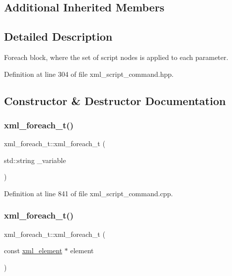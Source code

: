 \subsection*{Additional Inherited Members}


\subsection{Detailed Description}
Foreach block, where the set of script nodes is applied to each parameter. 

Definition at line 304 of file xml\+\_\+script\+\_\+command.\+hpp.



\subsection{Constructor \& Destructor Documentation}
\mbox{\label{structxml__foreach__t_a89fa4359e0a17874e38af17944cb2104}} 
\subsubsection{\texorpdfstring{xml\+\_\+foreach\+\_\+t()}{xml\_foreach\_t()}\hspace{0.1cm}{\footnotesize\ttfamily [1/2]}}
{\footnotesize\ttfamily xml\+\_\+foreach\+\_\+t\+::xml\+\_\+foreach\+\_\+t (\begin{DoxyParamCaption}\item[{std\+::string}]{\+\_\+variable }\end{DoxyParamCaption})\hspace{0.3cm}{\ttfamily [explicit]}}



Definition at line 841 of file xml\+\_\+script\+\_\+command.\+cpp.

\mbox{\label{structxml__foreach__t_ab22830ff0fcf7c2f5c082cbc98fc1f67}} 
\subsubsection{\texorpdfstring{xml\+\_\+foreach\+\_\+t()}{xml\_foreach\_t()}\hspace{0.1cm}{\footnotesize\ttfamily [2/2]}}
{\footnotesize\ttfamily xml\+\_\+foreach\+\_\+t\+::xml\+\_\+foreach\+\_\+t (\begin{DoxyParamCaption}\item[{const \hyperlink{classxml__element}{xml\+\_\+element} $\ast$}]{element }\end{DoxyParamCaption})\hspace{0.3cm}{\ttfamily [explicit]}}



